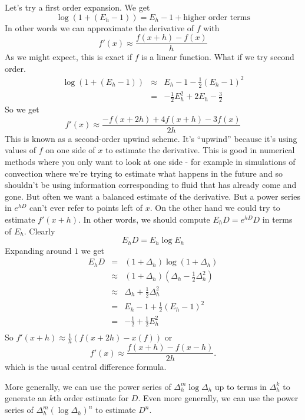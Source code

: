 \documentclass[a4paper]{article}
\theoremstyle{definition}
\begin{document}
Let's try a first order expansion.
We get
\[
\log(1+(E_h-1)) = E_h-1 + \mbox{higher order terms} 
\]
In other words we can approximate the derivative of $f$ with
\[
f'(x) \approx \frac{f(x+h)-f(x)}{h}
\]
As we might expect, this is exact if $f$ is a linear function.
What if we try second order.
\begin{eqnarray*}
\log(1+(E_h-1)) & \approx  & E_h-1 - \frac{1}{2}(E_h-1)^2 \\
& = & -\frac{1}{2}E_h^2+2E_h-\frac{3}{2}
\end{eqnarray*}
So we get
\[
f'(x) \approx \frac{-f(x+2h)+4f(x+h)-3f(x)}{2h}
\]
This is known as a second-order upwind scheme.
It's ``upwind'' because it's using values of $f$ on one side of $x$ to estimate the derivative.
This is good in numerical methods where you only want to look at one side - for example in simulations of convection where we're trying to estimate what happens in the future and so shouldn't be using information corresponding to fluid that has already come and gone.
But often we want a balanced estimate of the derivative.
But a power series in $e^{hD}$ can't ever refer to points left of $x$.
On the other hand we could try to estimate $f'(x+h)$.
In other words, we should compute $E_hD=e^{hD}D$ in terms of $E_h$.
Clearly
\[
E_hD = E_h\log E_h
\]
Expanding around $1$ we get
\begin{eqnarray*}
E_hD & = & (1+\Delta_h)\log(1+\Delta_h) \\
& \approx & (1+\Delta_h)(\Delta_h-\frac{1}{2}\Delta_h^2) \\
& \approx & \Delta_h+\frac{1}{2}\Delta_h^2 \\
& = & E_h-1+\frac{1}{2}(E_h-1)^2 \\
& = & -\frac{1}{2}+\frac{1}{2}E_h^2\\
\end{eqnarray*}
So $f'(x+h) \approx \frac{1}{h}(f(x+2h)-x(f))$ or
\[
f'(x) \approx \frac{f(x+h)-f(x-h)}{2h}.
\]
which is the usual central difference formula.

More generally, we can use the power series of $\Delta_h^m\log\Delta_h$ up to terms in $\Delta_h^k$ to generate an $k$th order estimate for $D$.
Even more generally, we can use the power series of $\Delta_h^m(\log\Delta_h)^n$ to estimate $D^n$.
\end{document}
